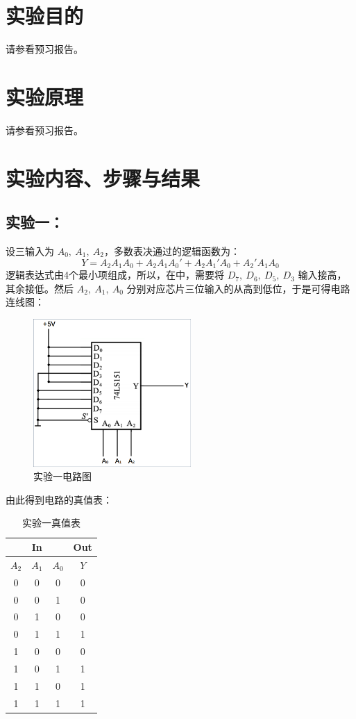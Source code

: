 \documentclass[a4paper,11pt,UTF8]{ctexart}
\begin{document}
\newcommand{\CI}{C\negthinspace I}
\newcommand{\CO}{C\negthinspace O}
%

\section{实验目的}

请参看预习报告。

\section{实验原理}

请参看预习报告。

\section{实验内容、步骤与结果}
 \subsection{实验一：\expa}
  \p 设三输入为 $A_0,\ A_1,\ A_2$，多数表决通过的逻辑函数为：
  \[ Y=A_2A_1A_0+A_2A_1A_0'+A_2A_1'A_0+A_2'A_1A_0 \]
  \p 逻辑表达式由4个最小项组成，所以，在\chip 中，需要将 $D_7,\ D_6,\ D_5,\ D_3$ 输入接高，其余接低。然后 $A_2,\ A_1,\ A_0$ 分别对应芯片三位输入的从高到低位，于是可得电路连线图：
  \begin{figure}[H]
   \centering
   \includegraphics[width=6cm]{Exp01}
   \caption{实验一电路图}
   \label{fig:Exp01}
  \end{figure}
  \p 由此得到电路的真值表：
  \begin{table}[H]
   \centering
   \begin{tabular}{|ccc|c|}\hline
    \multicolumn{3}{|c|}{In} &Out
    \\\hline
    $A_2$ &$A_1$ &$A_0$ &$Y$
    \\\hline
    0 &0 &0 &0\\
    0 &0 &1 &0\\
    0 &1 &0 &0\\
    0 &1 &1 &1\\
    1 &0 &0 &0\\
    1 &0 &1 &1\\
    1 &1 &0 &1\\
    1 &1 &1 &1
    \\\hline
   \end{tabular}
   \caption{实验一真值表}
   \label{tab:Exp01}
  \end{table}
  
\end{document}
